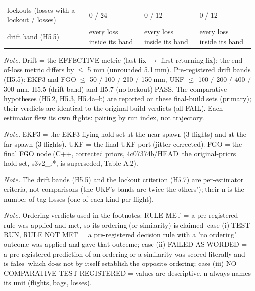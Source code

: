 \begin{table}[htbp]
\begin{tabular}{p{}p{}p{}p{}}
lockouts (losses with a lockout / losses) & 0 / 24 & 0 / 12 & 0 / 12 \\
drift band (H5.5) & every loss inside its band & every loss inside its band & every loss inside its band \\
\bottomrule
\end{tabular}
\par\smallskip\raggedright
\textit{Note.} Drift = the EFFECTIVE metric (last fix $\rightarrow$ first returning fix); the end-of-loss metric differs by $\le$ 5 mm (unrounded 5.1 mm). Pre-registered drift bands (H5.5): EKF3 and FGO $\le$ 50 / 100 / 200 / 150 mm, UKF $\le$ 100 / 200 / 400 / 300 mm. H5.5 (drift band) and H5.7 (no lockout) PASS. The comparative hypotheses (H5.2, H5.3, H5.4a--b) are reported on these final-build sets (primary); their verdicts are identical to the original-build verdicts (all FAIL). Each estimator flew its own flights: pairing by run index, not trajectory.\par
\textit{Note.} EKF3 = the EKF3-flying hold set at the near spawn (3 flights) and at the far spawn (3 flights). UKF = the final UKF port (jitter-corrected); FGO = the final FGO node (C++, corrected priors, 4c07374b/HEAD; the original-priors hold set, s3v2\_r*, is superseded, Table A.2).\par
\textit{Note.} The drift bands (H5.5) and the lockout criterion (H5.7) are per-estimator criteria, not comparisons (the UKF's bands are twice the others'); their n is the number of tag losses (one of each kind per flight).\par
\textit{Note.} Ordering verdicts used in the footnotes: RULE MET = a pre-registered rule was applied and met, so its ordering (or similarity) is claimed; case (i) TEST RUN, RULE NOT MET = a pre-registered decision rule with a 'no ordering' outcome was applied and gave that outcome; case (ii) FAILED AS WORDED = a pre-registered prediction of an ordering or a similarity was scored literally and is false, which does not by itself establish the opposite ordering; case (iii) NO COMPARATIVE TEST REGISTERED = values are descriptive. n always names its unit (flights, bags, losses).\par

\end{table}
